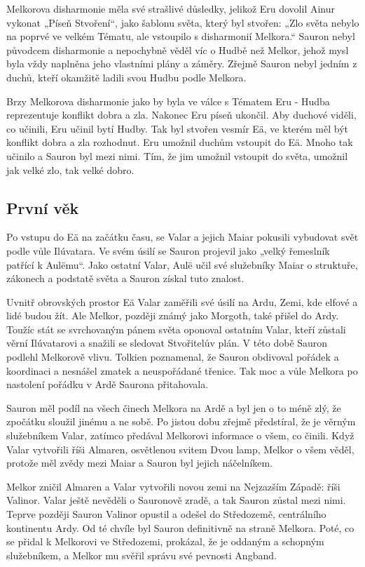 \documentclass[12pt]{article}
\begin{document}
Melkorova disharmonie měla své strašlivé důsledky, jelikož Eru dovolil Ainur vykonat „Píseň Stvoření“, jako šablonu světa, který byl stvořen: „Zlo světa nebylo na poprvé ve velkém Tématu, ale vstoupilo s disharmonií Melkora.“ Sauron nebyl původcem disharmonie a nepochybně věděl víc o Hudbě než Melkor, jehož mysl byla vždy naplněna jeho vlastními plány a záměry. Zřejmě Sauron nebyl jedním z duchů, kteří okamžitě ladili svou Hudbu podle Melkora.

Brzy Melkorova disharmonie jako by byla ve válce s Tématem Eru - Hudba reprezentuje konflikt dobra a zla. Nakonec Eru píseň ukončil. Aby duchové viděli, co učinili, Eru učinil bytí Hudby. Tak byl stvořen vesmír Eä, ve kterém měl být konflikt dobra a zla rozhodnut. Eru umožnil duchům vstoupit do Eä. Mnoho tak učinilo a Sauron byl mezi nimi. Tím, že jim umožnil vstoupit do světa, umožnil jak velké zlo, tak velké dobro. 

\subsection{První věk}
Po vstupu do Eä na začátku času, se Valar a jejich Maiar pokusili vybudovat svět podle vůle Ilúvatara. Ve svém úsilí se Sauron projevil jako „velký řemeslník patřící k Aulëmu“. Jako ostatní Valar, Aulë učil své služebníky Maiar o struktuře, zákonech a podstatě světa a Sauron získal tuto znalost.

Uvnitř obrovských prostor Eä Valar zaměřili své úsilí na Ardu, Zemi, kde elfové a lidé budou žít. Ale Melkor, později známý jako Morgoth, také přišel do Ardy. Toužíc stát se svrchovaným pánem světa oponoval ostatním Valar, kteří zůstali věrní Ilúvatarovi a snažili se sledovat Stvořitelův plán. V této době Sauron podlehl Melkorově vlivu. Tolkien poznamenal, že Sauron obdivoval pořádek a koordinaci a nesnášel zmatek a neuspořádané třenice. Tak moc a vůle Melkora po nastolení pořádku v Ardě Saurona přitahovala.

Sauron měl podíl na všech činech Melkora na Ardě a byl jen o to méně zlý, že zpočátku sloužil jinému a ne sobě. Po jistou dobu zřejmě předstíral, že je věrným služebníkem Valar, zatímco předával Melkorovi informace o všem, co činili. Když Valar vytvořili říši Almaren, osvětlenou svitem Dvou lamp, Melkor o všem věděl, protože měl zvědy mezi Maiar a Sauron byl jejich náčelníkem.

Melkor zničil Almaren a Valar vytvořili novou zemi na Nejzazším Západě: říši Valinor. Valar ještě nevěděli o Sauronově zradě, a tak Sauron zůstal mezi nimi. Teprve později Sauron Valinor opustil a odešel do Středozemě, centrálního kontinentu Ardy. Od té chvíle byl Sauron definitivně na straně Melkora. Poté, co se přidal k Melkorovi ve Středozemi, prokázal, že je oddaným a schopným služebníkem, a Melkor mu svěřil správu své pevnosti Angband.
\end{document}
